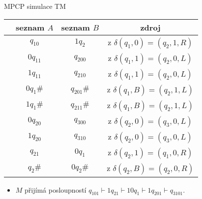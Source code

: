     
    \begin{frame}{MPCP simulace TM}
    \begin{minipage}{0.65\textwidth}
    \begin{tabular}{c  c |c| c }
     & seznam $A$ & seznam $B$ & zdroj\\
    \hline
     & {\cellcolor{blue} $q_10$} & \cellcolor{blue}$1q_2$ & z $\delta(q_1,0)=(q_2,1,R)$ \\
     & $0q_11$ & $q_200$ & z $\delta(q_1,1)=(q_2,0,L)$ \\
     & $1q_11$ & $q_210$ & z $\delta(q_1,1)=(q_2,0,L)$ \\
     & {\cellcolor{violet}$0q_1\#$} & \cellcolor{violet}$q_201\#$ & z $\delta(q_1,B)=(q_2,1,L)$ \\
     & $1q_1\#$ & $q_211\#$ & z $\delta(q_1,B)=(q_2,1,L)$ \\
     & $0q_20$ & $q_300$ & z $\delta(q_2,0)=(q_3,0,L)$ \\
     & {\cellcolor{orange} $1q_20$} & \cellcolor{orange}$q_310$ & z $\delta(q_2,0)=(q_3,0,L)$ \\
     & {\cellcolor{red}$q_21$} & \cellcolor{red}$0q_1$ & z $\delta(q_2,1)=(q_1,0,R)$ \\
     & $q_2\#$ & $0q_2\#$ & z $\delta(q_2,B)=(q_2,0,R)$ \\
    \hline
    \end{tabular}
    
    \begin{itemize}
        \item $M$ přijímá posloupností $q_101\vdash 1q_21 \vdash 10q_1 \vdash 1q_201 \vdash q_3101$.
    \end{itemize}
    

\end{minipage}
\end{frame}
